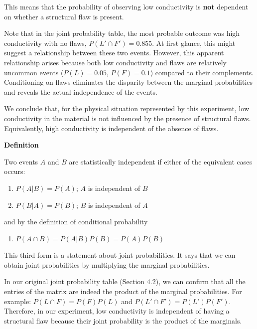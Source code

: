 \documentclass[
]{book}
\providecommand{\tightlist}{%
  \setlength{\itemsep}{0pt}\setlength{\parskip}{0pt}}
\begin{document}
This means that the probability of observing low conductivity is \textbf{not} dependent on whether a structural flaw is present.

Note that in the joint probability table, the most probable outcome was high conductivity with no flaws, \(P(L' \cap F') = 0.855\). At first glance, this might suggest a relationship between these two events. However, this apparent relationship arises because both low conductivity and flaws are relatively uncommon events (\(P(L) = 0.05\), \(P(F) = 0.1\)) compared to their complements. Conditioning on flaws eliminates the disparity between the marginal probabilities and reveals the actual independence of the events.

We conclude that, for the physical situation represented by this experiment, low conductivity in the material is not influenced by the presence of structural flaws. Equivalently, high conductivity is independent of the absence of flaws.

\textbf{Definition}

Two events \(A\) and \(B\) are statistically independent if either of the equivalent cases occurs:

\begin{enumerate}
\def\labelenumi{\arabic{enumi})}
\tightlist
\item
  \(P(A| B)= P(A)\); \(A\) is independent of \(B\)
\item
  \(P(B| A)= P(B)\); \(B\) is independent of \(A\)
\end{enumerate}

and by the definition of conditional probability

\begin{enumerate}
\def\labelenumi{\arabic{enumi})}
\setcounter{enumi}{2}
\tightlist
\item
  \(P(A\cap B)=P(A|B)P(B)=P(A)P(B)\)
\end{enumerate}

This third form is a statement about joint probabilities. It says that we can obtain joint probabilities by multiplying the marginal probabilities.

In our original joint probability table (Section 4.2),
we can confirm that all the entries of the matrix are indeed the product of the marginal probabilities. For example: \(P( L \cap F)=P(F)P(L)\) and \(P(L' \cap F')=P(L')P(F')\). Therefore, in our experiment, low conductivity is independent of having a structural flaw because their joint probability is the product of the marginals.
\end{document}
